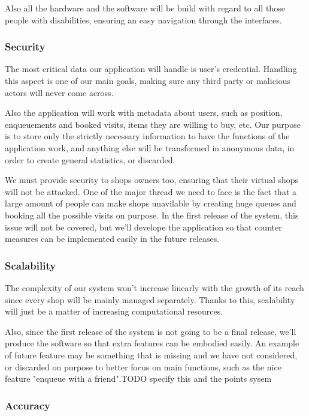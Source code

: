 Also all the hardware and the software will be build with regard to all those people with disabilities, ensuring an easy navigation through the interfaces.

\subsubsection{Security}
\label{subsubsect:security}

The most critical data our application will handle is user's credential. Handling this aspect is one of our main goals, making sure any third party or malicious actors will never come across. 

Also the application will work with metadata about users, such as position, enqueuements and booked visits, items they are willing to buy, etc. Our purpose is to store only the strictly necessary information to have the functions of the application work, and anything else will be transformed in anonymous data, in order to create general statistics, or discarded.

We must provide security to shops owners too, ensuring that their virtual shops will not be attacked. One of the major thread we need to face is the fact that a large amount of people can make shops unavilable by creating huge queues and booking all the possible visits on purpose. In the first release of the system, this issue will not be covered, but we'll develope the application so that counter measures can be implemented easily in the future releases.

\subsubsection{Scalability}
\label{subsubsect:scalability}

The complexity of our system won't increase linearly with the growth of its reach since every shop will be mainly managed separately.
Thanks to this, scalability will just be a matter of increasing computational resources. 

Also, since the first release of the system is not going to be a final release, we'll produce the software so that extra features can be embodied easily. An example of future feature may be something that is missing and we have not considered, or discarded on purpose to better focus on main functions, such as the nice feature "enqueue with a friend".TODO specify this and the points sysem

\subsubsection{Accuracy}
\label{subsubsect:accuracy}

